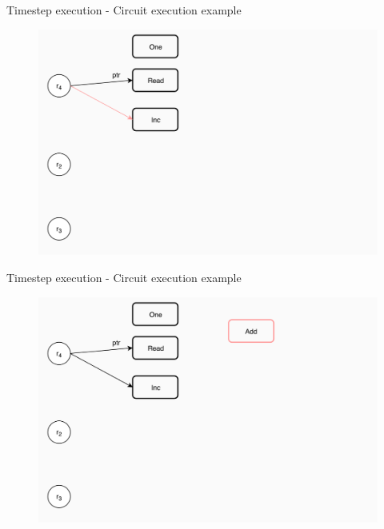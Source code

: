 \documentclass[xcolor={usenames}]{beamer}
\begin{document}
  \begin{frame}{Timestep execution - Circuit execution example}
  	\begin{figure}
  		\centering
  		\includegraphics[width=\textwidth]{../figures/example-circuit-5.png}
  	\end{figure}
  \end{frame}
  \begin{frame}{Timestep execution - Circuit execution example}
  	\begin{figure}
  		\centering
  		\includegraphics[width=\textwidth]{../figures/example-circuit-6.png}
  	\end{figure}
  \end{frame}
\end{document}
